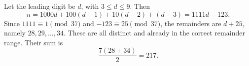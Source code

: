 Let the leading digit be $d$, with $3\le d\le9$. Then
\[
n=1000d+100(d-1)+10(d-2)+(d-3)=1111d-123.
\]
Since $1111\equiv1\pmod{37}$ and $-123\equiv25\pmod{37}$, the remainders are $d+25$, namely $28,29,\ldots,34$. These are all distinct and already in the correct remainder range. Their sum is
\[
\boxed{\dfrac{7(28+34)}{2}=217}.
\]

